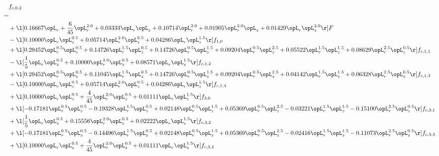 \begin{alignat}{2} 
\label{eq:f_02_1} 
& f_{c,0,2} \nonumber \\ 
 = \\ 
& + \l[  0.16667 \opL_r + \frac{6}{45} \opL_r^{2.0} +  0.03333 \opL_r \opL_z +  0.10714 \opL_r^{3.0} +  0.01905 \opL_r^{2.0} \opL_z +  0.01429 \opL_r \opL_z^{2.0}  \r] F \nonumber \\ 
& - \l[  0.10000 \opL_r \opL_z^{0.5} +  0.05714 \opL_r^{2.0} \opL_z^{0.5} +  0.04286 \opL_r \opL_z^{1.5}  \r] f_{1,0} \nonumber \\ 
& + \l[  0.29452 \opL_r^{0.5} \opL_z^{0.5} +  0.14726 \opL_r^{1.5} \opL_z^{0.5} +  0.14726 \opL_r^{0.5} \opL_z^{1.5} +  0.09204 \opL_r^{0.5} \opL_z^{2.5} +  0.05522 \opL_r^{1.5} \opL_z^{1.5} +  0.08629 \opL_r^{2.5} \opL_z^{0.5}  \r] f_{c,1,1} \nonumber \\ 
& - \l[ \frac{1}{5} \opL_r \opL_z^{0.5} +  0.10000 \opL_r^{2.0} \opL_z^{0.5} +  0.08571 \opL_r \opL_z^{1.5}  \r] f_{c,1,2} \nonumber \\ 
& + \l[  0.29452 \opL_r^{0.5} \opL_z^{0.5} +  0.11045 \opL_r^{1.5} \opL_z^{0.5} +  0.14726 \opL_r^{0.5} \opL_z^{1.5} +  0.09204 \opL_r^{0.5} \opL_z^{2.5} +  0.04142 \opL_r^{1.5} \opL_z^{1.5} +  0.06328 \opL_r^{2.5} \opL_z^{0.5}  \r] f_{c,1,3} \nonumber \\ 
& - \l[  0.10000 \opL_r \opL_z^{0.5} +  0.05714 \opL_r^{2.0} \opL_z^{0.5} +  0.04286 \opL_r \opL_z^{1.5}  \r] f_{c,1,4} \nonumber \\ 
& + \l[  0.10000 \opL_r \opL_z^{0.5} + \frac{4}{45} \opL_r^{2.0} \opL_z^{0.5} +  0.01111 \opL_r \opL_z^{1.5}  \r] f_{3,0} \nonumber \\ 
& + \l[  -0.17181 \opL_r^{0.5} \opL_z^{0.5}   -0.19328 \opL_r^{1.5} \opL_z^{0.5} +  0.02148 \opL_r^{0.5} \opL_z^{1.5} +  0.05369 \opL_r^{0.5} \opL_z^{2.5}   -0.03221 \opL_r^{1.5} \opL_z^{1.5}   -0.15100 \opL_r^{2.5} \opL_z^{0.5}  \r] f_{c,3,1} \nonumber \\ 
& + \l[ \frac{1}{5} \opL_r \opL_z^{0.5} +  0.15556 \opL_r^{2.0} \opL_z^{0.5} +  0.02222 \opL_r \opL_z^{1.5}  \r] f_{c,3,2} \nonumber \\ 
& + \l[  -0.17181 \opL_r^{0.5} \opL_z^{0.5}   -0.14496 \opL_r^{1.5} \opL_z^{0.5} +  0.02148 \opL_r^{0.5} \opL_z^{1.5} +  0.05369 \opL_r^{0.5} \opL_z^{2.5}   -0.02416 \opL_r^{1.5} \opL_z^{1.5}   -0.11073 \opL_r^{2.5} \opL_z^{0.5}  \r] f_{c,3,3} \nonumber \\ 
& + \l[  0.10000 \opL_r \opL_z^{0.5} + \frac{4}{45} \opL_r^{2.0} \opL_z^{0.5} +  0.01111 \opL_r \opL_z^{1.5}  \r] f_{c,3,4} \nonumber \\ 

\end{alignat}

